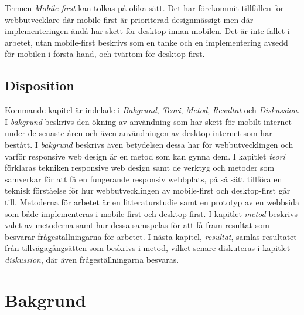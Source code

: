 \documentclass[11pt]{article}
\begin{document}
Termen \textit{Mobile-first} kan tolkas på olika sätt. Det har förekommit tillfällen för webbutvecklare där mobile-first är prioriterad designmässigt men där implementeringen ändå har skett för desktop innan mobilen. Det är inte fallet i arbetet, utan mobile-first beskrivs som en tanke och en implementering avsedd för mobilen i första hand, och tvärtom för desktop-first. 

\subsection{Disposition}

Kommande kapitel är indelade i \textit{Bakgrund}, \textit{Teori}, \textit{Metod}, \textit{Resultat} och \textit{Diskussion}. I \textit{bakgrund} beskrivs den ökning av användning som har skett för mobilt internet under de senaste åren och även användningen av desktop internet som har bestått. I \textit{bakgrund} beskrivs även betydelsen dessa har för webbutvecklingen och varför responsive web design är en metod som kan gynna dem. I kapitlet \textit{teori} förklaras tekniken responsive web design samt de verktyg och metoder som samverkar för att få en fungerande responsiv webbplats, på så sätt tillföra en teknisk förståelse för hur webbutvecklingen av mobile-first och desktop-first går till. Metoderna för arbetet är en litteraturstudie samt en prototyp av en webbsida som både implementeras i mobile-first och desktop-first. I kapitlet \textit{metod} beskrivs valet av metoderna samt hur dessa samspelas för att få fram resultat som besvarar frågeställningarna för arbetet. I nästa kapitel, \textit{resultat}, samlas resultatet från tillvägagångsätten som beskrivs i metod, vilket senare diskuteras i kapitlet \textit{diskussion}, där även frågeställningarna besvaras.



\newpage


\section{Bakgrund}
\end{document}
